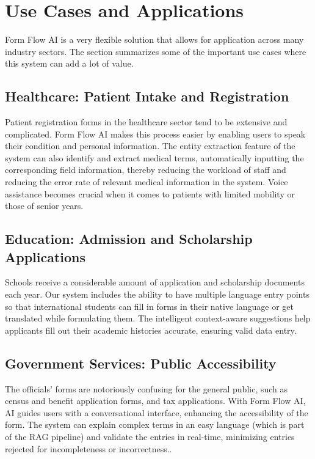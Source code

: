 \documentclass[conference]{IEEEtran}
\begin{document}
\section{Use Cases and Applications}

Form Flow AI is a very flexible solution that allows for application across many industry sectors. The section summarizes some of the important use cases where this system can add a lot of value.

\subsection{Healthcare: Patient Intake and Registration}

Patient registration forms in the healthcare sector tend to be extensive and complicated. Form Flow AI makes this process easier by enabling users to speak their condition and personal information. The entity extraction feature of the system can also identify and extract medical terms, automatically inputting the corresponding field information, thereby reducing the workload of staff and reducing the error rate of relevant medical information in the system. Voice assistance becomes crucial when it comes to patients with limited mobility or those of senior years.

\subsection{Education: Admission and Scholarship Applications}

Schools receive a considerable amount of application and scholarship documents each year. Our system includes the ability to have multiple language entry points so that international students can fill in forms in their native language or get translated while formulating them. The intelligent context-aware suggestions help applicants fill out their academic histories accurate, ensuring valid data entry.

\subsection{Government Services: Public Accessibility}

The officials' forms are notoriously confusing for the general public, such as census and benefit application forms, and tax applications. With Form Flow AI, AI guides users with a conversational interface, enhancing the accessibility of the form. The system can explain complex terms in an easy language (which is part of the RAG pipeline) and validate the entries in real-time, minimizing entries rejected for incompleteness or incorrectness..
\end{document}
